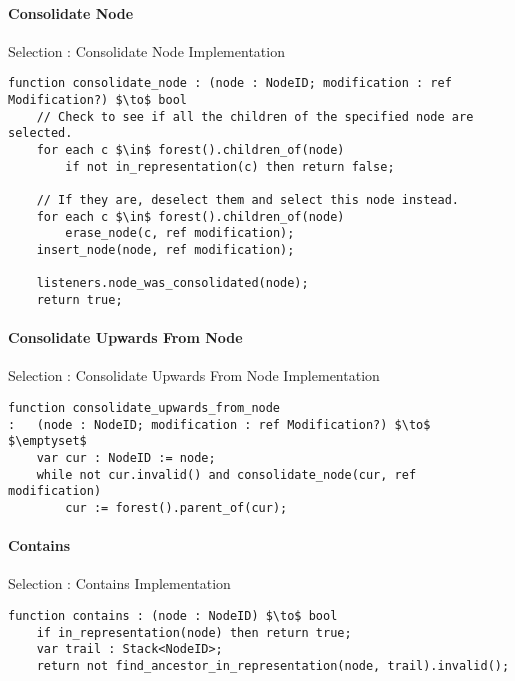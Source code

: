 \paragraph{Consolidate Node}

\begin{stulisting}[H]
\caption{Selection : Consolidate Node Implementation}
\begin{lstlisting}[style=Default]
function consolidate_node : (node : NodeID; modification : ref Modification?) $\to$ bool
	// Check to see if all the children of the specified node are selected.
	for each c $\in$ forest().children_of(node)
		if not in_representation(c) then return false;

	// If they are, deselect them and select this node instead.
	for each c $\in$ forest().children_of(node)
		erase_node(c, ref modification);
	insert_node(node, ref modification);

	listeners.node_was_consolidated(node);
	return true;
\end{lstlisting}
\end{stulisting}

\paragraph{Consolidate Upwards From Node}

\begin{stulisting}[H]
\caption{Selection : Consolidate Upwards From Node Implementation}
\begin{lstlisting}[style=Default]
function consolidate_upwards_from_node
:	(node : NodeID; modification : ref Modification?) $\to$ $\emptyset$
	var cur : NodeID := node;
	while not cur.invalid() and consolidate_node(cur, ref modification)
		cur := forest().parent_of(cur);
\end{lstlisting}
\end{stulisting}

\paragraph{Contains}

\begin{stulisting}[H]
\caption{Selection : Contains Implementation}
\begin{lstlisting}[style=Default]
function contains : (node : NodeID) $\to$ bool
	if in_representation(node) then return true;
	var trail : Stack<NodeID>;
	return not find_ancestor_in_representation(node, trail).invalid();
\end{lstlisting}
\end{stulisting}

